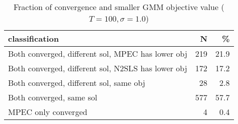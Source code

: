 \begin{table}

\caption{\label{tab:unnamed-chunk-13}Fraction of convergence and smaller GMM objective value ($T=100,\sigma=1.0$)}
\centering
\begin{tabular}[t]{lrr}
\toprule
classification & N & \%\\
\midrule
Both converged, different sol, MPEC has lower obj & 219 & 21.9\\
Both converged, different sol, N2SLS has lower obj & 172 & 17.2\\
Both converged, different sol, same obj & 28 & 2.8\\
Both converged, same sol & 577 & 57.7\\
MPEC only converged & 4 & 0.4\\
\bottomrule
\end{tabular}
\end{table}
